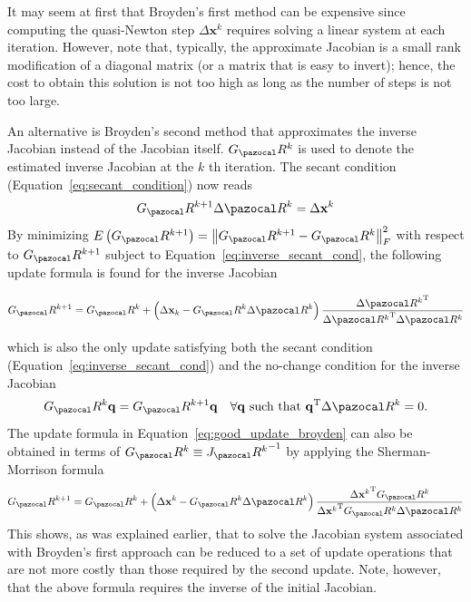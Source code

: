 It may seem at first that Broyden's first method can be expensive since computing the quasi-Newton step \(\Delta \mathbf x^{k}\) requires solving a linear system at each iteration.
However, note that, typically, the approximate Jacobian is a small rank modification of a diagonal matrix (or a matrix that is easy to invert); hence, the cost to obtain this solution is not too high as long as the number of steps is not too large.

An alternative is Broyden's second method that approximates the inverse Jacobian instead of the Jacobian itself.
\(G_\pazocal R^{k}\) is used to denote the estimated inverse Jacobian at the \(k\) th iteration.
The secant condition (Equation~\eqref{eq:secant_condition}) now reads
\begin{equation} \label{eq:inverse_secant_cond}
G_\pazocal R^{k+1} \Delta \pazocal R^{k}=\Delta \mathbf x^{k}
\end{equation}
By minimizing \(E\left(G_\pazocal R^{k+1}\right)=\left\|G_\pazocal R^{k+1}-G_\pazocal R^{k}\right\|_{F}^{2}\) with respect to \(G_\pazocal R^{k+1}\) subject to Equation~\eqref{eq:inverse_secant_cond}, the following update formula is found for the inverse Jacobian
\begin{highlight}
  \begin{equation} \label{eq:bad_update_broyden}
  G_\pazocal R^{k+1}=G_\pazocal R^{k}+\left(\Delta \mathbf x_{k}-G_\pazocal R^{k} \Delta \pazocal R^{k}\right) \frac{\Delta {\pazocal R^{k}}^{\mathrm{T}}}{\Delta {\pazocal R^{k}}^{\mathrm{T}} \Delta \pazocal R^{k}}
  \end{equation}
\end{highlight}
which is also the only update satisfying both the secant condition (Equation~\eqref{eq:inverse_secant_cond}) and the no-change condition for the inverse Jacobian
\begin{equation}
  G_\pazocal R^{k} \mathbf q=G_\pazocal R^{k+1} \mathbf q \quad \forall \mathbf q \text { such that } \mathbf q^{\mathrm{T}} \Delta \pazocal R^{k}=0.
\end{equation}
The update formula in Equation~\eqref{eq:good_update_broyden} can also be obtained in terms of \(G_\pazocal R^{k} \equiv {J_\pazocal R^{k}}^{-1}\) by applying the Sherman-Morrison formula
\begin{equation}
G_\pazocal R^{k+1}=G_\pazocal R^{k}+\left(\Delta \mathbf x^{k}-G_\pazocal R^{k} \Delta \pazocal R^{k}\right) \frac{\Delta {\mathbf x^{k}}^{\mathrm{T}} G_\pazocal R^{k}}{\Delta {\mathbf x^{k}}^{\mathrm{T}} G_\pazocal R^{k} \Delta \pazocal R^{k}}
\end{equation}
This shows, as was explained earlier, that to solve the Jacobian system associated with Broyden's first approach can be reduced to a set of update operations that are not more costly than those required by the second update.
Note, however, that the above formula requires the inverse of the initial Jacobian.

